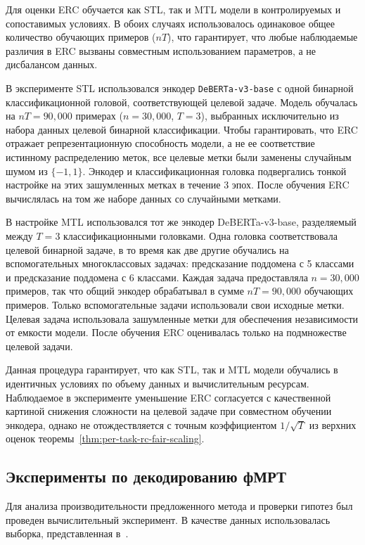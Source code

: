 Для оценки ERC обучается как STL, так и MTL модели в контролируемых и сопоставимых условиях.
В обоих случаях использовалось одинаковое общее количество обучающих примеров (\(nT\)), что гарантирует, что любые наблюдаемые различия в ERC вызваны совместным использованием параметров, а не дисбалансом данных.

В эксперименте STL использовался энкодер \texttt{DeBERTa-v3-base} с одной бинарной классификационной головой, соответствующей целевой задаче.
Модель обучалась на \(nT = 90{,}000\) примерах (\(n = 30{,}000\), \(T = 3\)), выбранных исключительно из набора данных целевой бинарной классификации.
Чтобы гарантировать, что ERC отражает репрезентационную способность модели, а не ее соответствие истинному распределению меток, все целевые метки были заменены случайным шумом из \(\{-1, 1\}\).
Энкодер и классификационная головка подвергались тонкой настройке на этих зашумленных метках в течение 3 эпох.
После обучения ERC вычислялась на том же наборе данных со случайными метками.

В настройке MTL использовался тот же энкодер DeBERTa-v3-base, разделяемый между \(T=3\) классификационными головками.
Одна головка соответствовала целевой бинарной задаче, в то время как две другие обучались на вспомогательных многоклассовых задачах: предсказание поддомена с 5 классами и предсказание поддомена с 6 классами.
Каждая задача предоставляла \(n = 30{,}000\) примеров, так что общий энкодер обрабатывал в сумме \(nT = 90{,}000\) обучающих примеров.
Только вспомогательные задачи использовали свои исходные метки. Целевая задача использовала зашумленные метки для обеспечения независимости от емкости модели.
После обучения ERC оценивалась только на подмножестве целевой задачи.

Данная процедура гарантирует, что как STL, так и MTL модели обучались в идентичных условиях по объему данных и вычислительным ресурсам.
Наблюдаемое в эксперименте уменьшение ERC согласуется с качественной картиной снижения сложности на целевой задаче при совместном обучении энкодера, однако не отождествляется с точным коэффициентом $1/\sqrt{T}$ из верхних оценок теоремы~\ref{thm:per-task-rc-fair-scaling}.

\subsection{Эксперименты по декодированию фМРТ}

Для анализа производительности предложенного метода и проверки гипотез был проведен вычислительный эксперимент.
В качестве данных использовалась выборка, представленная в~\cite{Berezutskaya2022}.

